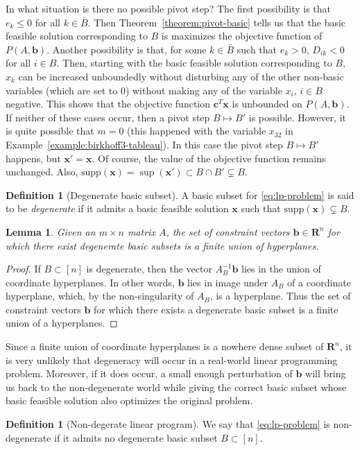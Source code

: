 \documentclass{amsbook}
\newcommand{\xx}{\mathbf x}
\newcommand{\cc}{\mathbf c}
\newcommand{\bb}{\mathbf b}
\newcommand{\supp}{\mathrm{supp}}
\newcommand{\RR}{\mathbf R}
\newtheorem{lemma}[theorem]{Lemma}
\theoremstyle{definition}
\newtheorem{definition}[theorem]{Definition}
\theoremstyle{remark}
\begin{document}
In what situation is there no possible pivot step?
The first possibility is that $e_k\leq 0$ for all $k\in \bar B$.
Then Theorem~\ref{theorem:pivot-basic} tells us that the basic feasible solution corresponding to $B$ is maximizes the objective function of $P(A,\bb)$.
Another possibility is that, for some $k\in\bar B$ such that $e_k>0$, $D_{ik}<0$ for all $i\in B$.
Then, starting with the basic feasible solution corresponding to $B$, $x_k$ can be increased unboundedly without disturbing any of the other non-basic variables (which are set to $0$) without making any of the variable $x_i$, $i\in B$ negative.
This shows that the objective function $\cc^T\xx$ is unbounded on $P(A,\bb)$.
If neither of these cases occur, then a pivot step $B\mapsto B'$ is possible.
However, it is quite possible that $m=0$ (this happened with the variable $x_{32}$ in Example~\ref{example:birkhoff3-tableau}).
In this case the pivot step $B\mapsto B'$ happens, but $\xx'=\xx$.
Of course, the value of the objective function remains unchanged.
Also, $\supp(\xx)=\sup(\xx')\subset B\cap B'\subsetneq B$.
\begin{definition}
  [Degenerate basic subset]
  A basic subset for \eqref{eq:lp-problem} is said to be \emph{degenerate} if it admits a basic feasible solution $\xx$ such that $\supp(\xx)\subsetneq B$.
\end{definition}
\begin{lemma}
  Given an $m\times n$ matrix $A$, the set of constraint vectors $\bb\in \RR^n$ for which there exist degenerate basic subsets is a finite union of hyperplanes.
\end{lemma}
\begin{proof}
  If $B\subset [n]$ is degenerate, then the vector $A_B^{-1}\bb$ lies in the union of coordinate hyperplanes.
  In other words, $\bb$ lies in image under $A_B$ of a coordinate hyperplane, which, by the non-singularity of $A_B$, is a hyperplane.
  Thus the set of constraint vectors $\bb$ for which there exists a degenerate basic subset is a finite union of a hyperplanes.
\end{proof}
Since a finite union of coordinate hyperplanes is a nowhere dense subset of $\RR^n$, it is very unlikely that degeneracy will occur in a real-world linear programming problem.
Moreover, if it does occur, a small enough perturbation of $\bb$ will bring us back to the non-degenerate world while giving the correct basic subset whose basic feasible solution also optimizes the original problem.
\begin{definition}[Non-degerate linear program]
  We say that \eqref{eq:lp-problem} is non-degenerate if it admits no degenerate basic subset $B\subset[n]$.
\end{definition}
\end{document}
